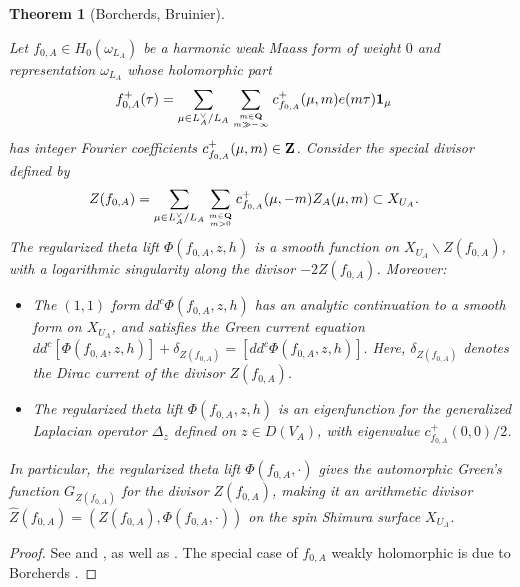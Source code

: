 \documentclass{amsart}
\newtheorem{theorem}{Theorem}[section]
\theoremstyle{definition}
\begin{document}
\begin{theorem}[Borcherds, Bruinier]\label{Green}

Let $f_{0, A} \in H_{0}(\omega_{L_A})$ be a harmonic weak Maass form of weight $0$ and representation $\omega_{L_A}$ whose holomorphic part 
\begin{align*} f_{0, A}^+(\tau) 
&= \sum\limits_{\mu \in L_A^{\vee}/L_A} \sum\limits_{m \in {\bf{Q}} \atop m \gg - \infty} c_{f_{0,A}}^+(\mu, m) e(m \tau) {\bf{1}}_{\mu}\end{align*}
has integer Fourier coefficients $c_{f_{0,A}}^+(\mu, m) \in {\bf{Z}}$. Consider the special divisor defined by
\begin{align*} Z(f_{0, A}) &= \sum\limits_{\mu \in L_A^{\vee}/L_A} \sum\limits_{m \in {\bf{Q}} \atop m >0} 
c^+_{f_{0,A}}(\mu, -m) Z_A(\mu, m) \subset X_{U_A}. \end{align*}
The regularized theta lift $\Phi(f_{0,A}, z, h)$ is a smooth function on $ X_{U_A} \backslash Z(f_{0,A})$, 
with a logarithmic singularity along the divisor $- 2 Z(f_{0, A})$. Moreover: \\

\begin{itemize}

\item The $(1, 1)$ form $d d^c \Phi( f_{0, A}, z, h)$ has an analytic continuation to a smooth form on $X_{U_A}$, and satisfies the Green 
current equation $d d^c [\Phi( f_{0, A}, z, h)] + \delta_{Z(f_{0, A})}= [d d^c \Phi( f_{0, A}, z, h)].$
Here, $\delta_{Z(f_{0, A})}$ denotes the Dirac current of the divisor $Z(f_{0, A})$. \\

\item The regularized theta lift $\Phi( f_{0, A}, z, h)$ is an eigenfunction for the generalized Laplacian operator $\Delta_z$
defined on $z \in D(V_A)$, with eigenvalue $c_{f_{0, A}}^+(0, 0)/2$. \\

\end{itemize} In particular, the regularized theta lift $\Phi( f_{0, A}, \cdot)$ gives the automorphic Green's function $G_{Z(f_{0, A})}$ for the divisor $Z(f_{0, A})$, 
making it an arithmetic divisor $\widehat{Z}(f_{0, A}) = (Z(f_{0, A}), \Phi( f_{0, A}, \cdot))$ on the spin Shimura surface $X_{U_A}$. \\

\end{theorem}

\begin{proof} See \cite[Theorems 4.2 and 4.3]{BY} and \cite{Br}, as well as \cite[Proposition 5.6, Theorem 6.1, Theorem 6.2]{BF}. 
The special case of $f_{0,A}$ weakly holomorphic is due to Borcherds \cite{Bo}. \end{proof}
\end{document}
